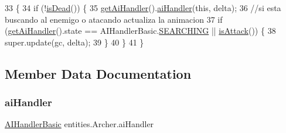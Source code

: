 \begin{DoxyCode}
33                                                      \{
34         \textcolor{keywordflow}{if} (!\mbox{\hyperlink{classentities_1_1_subject_a970082c9d187619c1a27dceec8b3b908}{isDead}}()) \{
35             \mbox{\hyperlink{classentities_1_1_archer_ae85ccf8025d689f81fa292006792349a}{getAiHandler}}().\mbox{\hyperlink{classentities_1_1_a_i_handler_basic_ae69789cadb89030804ac4ea2d1971e21}{aiHandler}}(\textcolor{keyword}{this}, delta);
36             \textcolor{comment}{//si esta buscando al enemigo o atacando actualiza la animacion}
37             \textcolor{keywordflow}{if} (\mbox{\hyperlink{classentities_1_1_archer_ae85ccf8025d689f81fa292006792349a}{getAiHandler}}().state == AIHandlerBasic.\mbox{\hyperlink{classentities_1_1_a_i_handler_basic_ac538f98b8bf642899b6cfe493258f381}{SEARCHING}} || 
      \mbox{\hyperlink{classentities_1_1_subject_a6c4ff8d1e50168c7738c8b39cec72631}{isAttack}}()) \{
38                 super.update(gc, delta);
39             \}
40         \}
41     \}
\end{DoxyCode}


\subsection{Member Data Documentation}
\mbox{\label{classentities_1_1_archer_a362254fb1ca99f07804647033ffe26d1}} 
\subsubsection{\texorpdfstring{ai\+Handler}{aiHandler}}
{\footnotesize\ttfamily \mbox{\hyperlink{classentities_1_1_a_i_handler_basic}{A\+I\+Handler\+Basic}} entities.\+Archer.\+ai\+Handler\hspace{0.3cm}{\ttfamily [private]}}

\mbox{\label{classentities_1_1_archer_ab90fa52ea365366f335cf1a724974c26}} 
